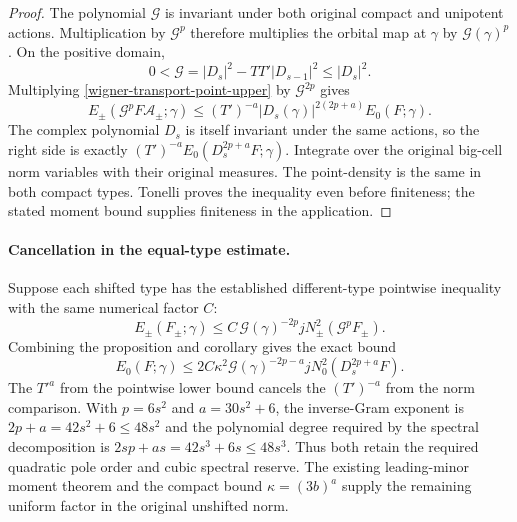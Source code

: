 \begin{proof}
The polynomial $\mathcal G$ is invariant under both original
compact and unipotent actions.  Multiplication by
$\mathcal G^p$ therefore multiplies the orbital map at $\gamma$
by $\mathcal G(\gamma)^p$.  On the positive domain,
\[
 0<\mathcal G=|D_s|^2-TT'|D_{s-1}|^2\le|D_s|^2.
\]
Multiplying \eqref{wigner-transport-point-upper} by
$\mathcal G^{2p}$ gives
\[
 E_\pm(\mathcal G^pF\mathcal A_\pm;\gamma)
 \le (T')^{-a}|D_s(\gamma)|^{2(2p+a)} E_0(F;\gamma).
\]
The complex polynomial $D_s$ is itself invariant under the same
actions, so the right side is exactly
$(T')^{-a}E_0(D_s^{2p+a}F;\gamma)$.  Integrate over the
original big-cell norm variables with their original measures.
The point-density is the same in both compact types.  Tonelli
proves the inequality even before finiteness; the stated moment
bound supplies finiteness in the application.
\end{proof}

\paragraph{Cancellation in the equal-type estimate.}
Suppose each shifted type has the established different-type
pointwise inequality with the same numerical factor $C$:
\[
 E_\pm(F_\pm;\gamma)
       \le C\,\mathcal G(\gamma)^{-2p}
                        jN_\pm^2(\mathcal G^pF_\pm).
\]
Combining the proposition and corollary gives the exact bound
\begin{equation}\label{wigner-transport-combined}
 E_0(F;\gamma)
 \le 2C\kappa^2\mathcal G(\gamma)^{-2p-a}
                              jN_0^2(D_s^{2p+a}F).
\end{equation}
The $T'^a$ from the pointwise lower bound cancels the
$(T')^{-a}$ from the norm comparison.  With $p=6s^2$ and
$a=30s^2+6$, the inverse-Gram exponent is
$2p+a=42s^2+6\le48s^2$ and the polynomial degree required
by the spectral decomposition is
$2sp+as=42s^3+6s\le48s^3$.
Thus both retain the required quadratic pole order and cubic
spectral reserve.  The existing leading-minor moment theorem
and the compact bound $\kappa=(3b)^a$ supply the remaining
uniform factor in the original unshifted norm.
